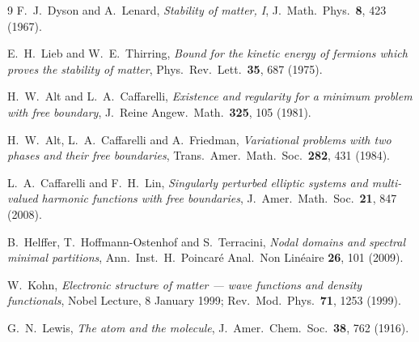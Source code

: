 \documentclass[11pt]{article}
\begin{document}
\begin{thebibliography}{9}
F.~J.~Dyson and A.~Lenard,
\emph{Stability of matter, I},
J.\ Math.\ Phys.\ \textbf{8}, 423 (1967).

E.~H.~Lieb and W.~E.~Thirring,
\emph{Bound for the kinetic energy of fermions which proves the stability of matter},
Phys.\ Rev.\ Lett.\ \textbf{35}, 687 (1975).

H.~W.~Alt and L.~A.~Caffarelli,
\emph{Existence and regularity for a minimum problem with free boundary},
J.\ Reine Angew.\ Math.\ \textbf{325}, 105 (1981).

H.~W.~Alt, L.~A.~Caffarelli and A.~Friedman,
\emph{Variational problems with two phases and their free boundaries},
Trans.\ Amer.\ Math.\ Soc.\ \textbf{282}, 431 (1984).

L.~A.~Caffarelli and F.~H.~Lin,
\emph{Singularly perturbed elliptic systems and multi-valued harmonic functions with free boundaries},
J.\ Amer.\ Math.\ Soc.\ \textbf{21}, 847 (2008).

B.~Helffer, T.~Hoffmann-Ostenhof and S.~Terracini,
\emph{Nodal domains and spectral minimal partitions},
Ann.\ Inst.\ H.\ Poincar\'e Anal.\ Non Lin\'eaire \textbf{26}, 101 (2009).

W.~Kohn,
\emph{Electronic structure of matter --- wave functions and density functionals},
Nobel Lecture, 8 January 1999;
Rev.\ Mod.\ Phys.\ \textbf{71}, 1253 (1999).

G.~N.~Lewis,
\emph{The atom and the molecule},
J.\ Amer.\ Chem.\ Soc.\ \textbf{38}, 762 (1916).

\end{thebibliography}
\end{document}
